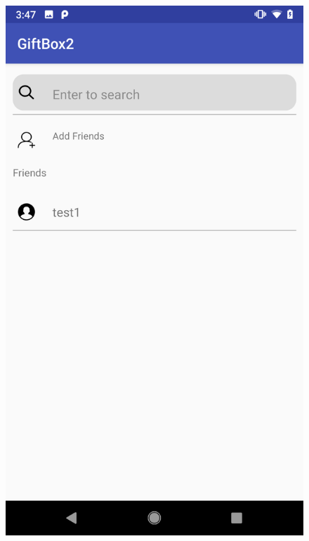 \begin{figure}[htb]
\centering
\begin{minipage}[t]{0.5\textwidth}
\includegraphics[width=.95\textwidth]{section03/assets/FriendsList.png}
\subcaption{\label{FriendsListUI}}
\end{minipage}%
\begin{minipage}[t]{0.5\textwidth}

\end{minipage}
\end{figure}
